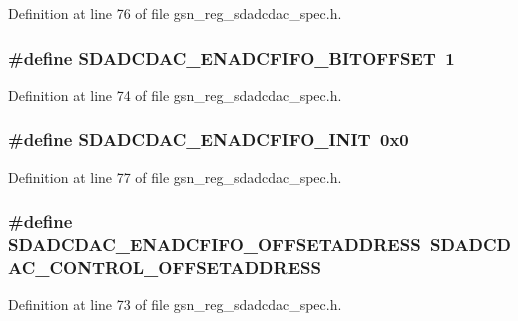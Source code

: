 Definition at line 76 of file gsn\_\-reg\_\-sdadcdac\_\-spec.h.

\hypertarget{a00569_abe750ee435f12405c386b78a2357297d}{
\subsubsection[{SDADCDAC\_\-ENADCFIFO\_\-BITOFFSET}]{\setlength{\rightskip}{0pt plus 5cm}\#define SDADCDAC\_\-ENADCFIFO\_\-BITOFFSET~1}}
\label{a00569_abe750ee435f12405c386b78a2357297d}


Definition at line 74 of file gsn\_\-reg\_\-sdadcdac\_\-spec.h.

\hypertarget{a00569_a0054ebcf588e7ffa7fc41088e62675e1}{
\subsubsection[{SDADCDAC\_\-ENADCFIFO\_\-INIT}]{\setlength{\rightskip}{0pt plus 5cm}\#define SDADCDAC\_\-ENADCFIFO\_\-INIT~0x0}}
\label{a00569_a0054ebcf588e7ffa7fc41088e62675e1}


Definition at line 77 of file gsn\_\-reg\_\-sdadcdac\_\-spec.h.

\hypertarget{a00569_a9bec7e44a8e4156e729cace875e708ab}{
\subsubsection[{SDADCDAC\_\-ENADCFIFO\_\-OFFSETADDRESS}]{\setlength{\rightskip}{0pt plus 5cm}\#define SDADCDAC\_\-ENADCFIFO\_\-OFFSETADDRESS~SDADCDAC\_\-CONTROL\_\-OFFSETADDRESS}}
\label{a00569_a9bec7e44a8e4156e729cace875e708ab}


Definition at line 73 of file gsn\_\-reg\_\-sdadcdac\_\-spec.h.


